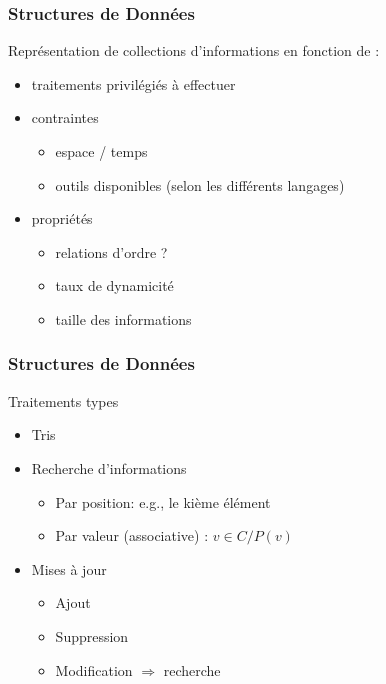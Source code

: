 \documentclass[table,handout,tikz,12pt,svgnames]{beamer}
\subtitle{\Huge Listes}
\date{CM2}
\begin{document}
\begin{frame}
	\titlepage
\end{frame}

\begin{frame}[fragile=singleslide]
	\frametitle{Structures de Données}
		\begin{block}{Représentation de collections d'informations en fonction de :}
			\begin{itemize}
			\item traitements privilégiés à effectuer
			\item contraintes
			\begin{itemize}
				\item espace / temps
				\item outils disponibles (selon les différents langages)
			\end{itemize}
			\item propriétés
			\begin{itemize}
				\item relations d'ordre ?
				\item taux de dynamicité
				\item taille des informations
			\end{itemize}
		\end{itemize}
		\end{block}
\end{frame}

\begin{frame}[fragile=singleslide]
	\frametitle{Structures de Données}
	\begin{block}{Traitements types}
		\begin{itemize}
			\item Tris
			\item Recherche d'informations
			\begin{itemize}
				\item Par position: e.g., le kième élément
				\item Par valeur (associative) : $v \in C / P(v)$
			\end{itemize}
			\item Mises à jour
			\begin{itemize}
				\item Ajout
				\item Suppression
				\item Modification $\Rightarrow$ recherche
			\end{itemize}
		\end{itemize}
	\end{block}
\end{frame}
\end{document}
